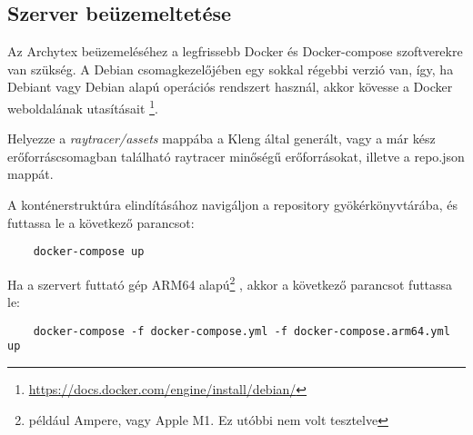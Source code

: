 \subsection{Szerver beüzemeltetése}\label{deploy}
Az Archytex beüzemeléséhez a legfrissebb Docker és Docker-compose szoftverekre van szükség. A Debian csomagkezelőjében egy sokkal régebbi verzió van, így, ha Debiant vagy Debian alapú operációs rendszert használ, akkor kövesse a Docker weboldalának utasításait \footnote{\url{https://docs.docker.com/engine/install/debian/}}.

Helyezze a \emph{raytracer/assets} mappába a Kleng által generált, vagy a már kész erőforráscsomagban található raytracer minőségű erőforrásokat, illetve a repo.json mappát.

A konténerstruktúra elindításához navigáljon a repository gyökérkönyvtárába, és futtassa le a következő parancsot:
\begin{lstlisting}
    docker-compose up
\end{lstlisting}

Ha a szervert futtató gép ARM64 alapú\footnote{például Ampere, vagy Apple M1. Ez utóbbi nem volt tesztelve} , akkor a következő parancsot futtassa le:
\begin{lstlisting}
    docker-compose -f docker-compose.yml -f docker-compose.arm64.yml up
\end{lstlisting}
